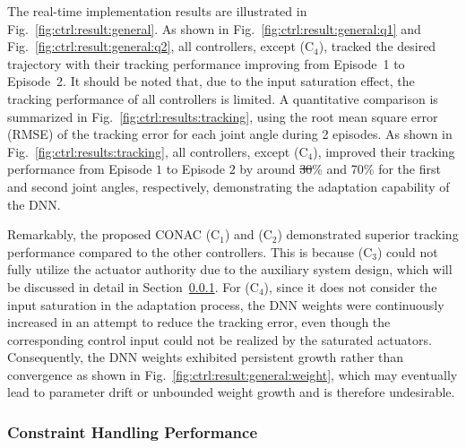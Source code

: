 \documentclass[letterpaper, journal]{IEEEtran}
\providecommand{\DIFadd}[1]{{\protect\color{blue}\uwave{#1}}} %
\providecommand{\DIFdel}[1]{{\protect\color{red}\sout{#1}}} %
\providecommand{\DIFaddbegin}{} %
\providecommand{\DIFaddend}{} %
\providecommand{\DIFdelbegin}{} %
\providecommand{\DIFdelend}{} %
\begin{document}
The real-time implementation results are illustrated in Fig.~\ref{fig:ctrl:result:general}.
As shown in Fig.~\ref{fig:ctrl:result:general:q1} and Fig.~\ref{fig:ctrl:result:general:q2}, all controllers, except (C$_4$), tracked the desired trajectory with their tracking performance improving from
Episode~1 to Episode~2.
It should be noted that, due to the input saturation effect, the tracking performance of all controllers is limited.
A quantitative comparison is summarized in Fig.~\ref{fig:ctrl:results:tracking}, using the root mean square error (RMSE) of the tracking error for each joint angle during 2 episodes.
As shown in Fig.~\ref{fig:ctrl:results:tracking}, all controllers, except (C$_4$), improved their tracking performance from Episode $1$ to Episode $2$ by around \DIFdelbegin \DIFdel{30}\DIFdelend \DIFaddbegin \DIFadd{25}\DIFaddend \% and 70\% for the first and second joint angles, respectively, demonstrating the adaptation capability of the DNN.

Remarkably, the proposed CONAC (C$_1$) and (C$_2$) demonstrated superior tracking performance compared to the other controllers.
This is because (C$_3$) could not fully utilize the actuator authority due to the auxiliary system design, which will be discussed in detail in Section~\ref{sec:val:results:constraint}.
For (C$_4$), since it does not consider the input saturation in the adaptation process, the DNN weights were continuously increased in an attempt to reduce the tracking error, even though the corresponding control input could not be realized by the saturated actuators.
Consequently, the DNN weights exhibited persistent growth rather than convergence as shown in Fig.~\ref{fig:ctrl:result:general:weight}, which may eventually lead to parameter drift or unbounded weight growth and is therefore undesirable.


\subsubsection{Constraint Handling Performance} \label{sec:val:results:constraint}
\end{document}
